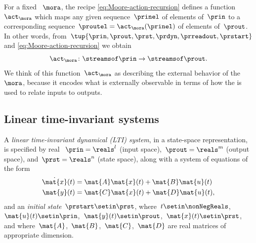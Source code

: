 For a fixed ~$\mora$, the recipe \cref{eq:Moore-action-recursion} defines a function~$\act_\mora$ which maps any given sequence~$\prinel$ of elements of~$\prin$ to a corresponding sequence~$\proutel = \act_\mora(\prinel)$ of elements of~$\prout$.
In other words, from~$\tup{\prin, \prout, \prst, \prdyn, \prreadout, \prstart}$ and \cref{eq:Moore-action-recursion} we obtain
\begin{equation}
    \act_\mora \colon \streamsof\prin  \to \streamsof\prout.
\end{equation}
We think of this function~$\act_\mora$ as describing the external behavior of the ~$\mora$, because it encodes what is externally observable in terms of how the  is used to relate inputs to outputs.






\subsection{Linear time-invariant systems}

\begin{definition}
    \label{def:LTI_syst_first_time}
    A \emph{linear time-invariant dynamical (LTI) system}, in a state-space representation, is specified by real ~$\prin=\reals^l$ (input space),~$\prout=\reals^m$ (output space), and~$\prst=\reals^n$ (state space), along with a system of equations of the form
    \begin{align}
        \dot{\mat{x}}(t) & = \mat{A}\mat{x}(t) + \mat{B}\mat{u}(t) \label{eq:LTI-system-dyn-equation} \\
        \mat{y}(t)       & = \mat{C}\mat{x}(t) + \mat{D}\mat{u}(t) \label{eq:LTI-system-ro-equation},
    \end{align}
    and an \emph{initial state}~$\prstart\setin \prst$, where~$t \setin \nonNegReals$,~$\mat{u}(t) \setin \prin$,~$\mat{y}(t) \setin \prout$,~$\mat{x}(t) \setin \prst$, and where~$\mat{A}$,~$\mat{B}$,~$\mat{C}$,~$\mat{D}$ are real matrices of appropriate dimension.
\end{definition}

